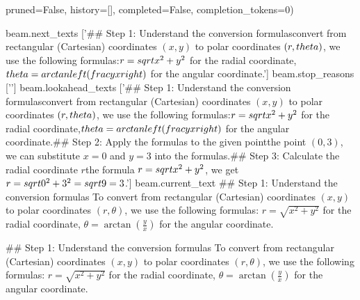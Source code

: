 pruned=False, history=[], completed=False, completion_tokens=0)

beam.next_texts
['## Step 1: Understand the conversion formulas\nTo convert from rectangular (Cartesian) coordinates $(x, y)$ to polar coordinates $(r, \\theta)$, we use the following formulas:\n$r = \\sqrt{x^2 + y^2}$ for the radial coordinate,\n$\\theta = \\arctan\\left(\\frac{y}{x}\\right)$ for the angular coordinate.\n\n']
beam.stop_reasons
['\n\n']
beam.lookahead_texts
['## Step 1: Understand the conversion formulas\nTo convert from rectangular (Cartesian) coordinates $(x, y)$ to polar coordinates $(r, \\theta)$, we use the following formulas:\n$r = \\sqrt{x^2 + y^2}$ for the radial coordinate,\n$\\theta = \\arctan\\left(\\frac{y}{x}\\right)$ for the angular coordinate.\n\n## Step 2: Apply the formulas to the given point\nGiven the point $(0, 3)$, we can substitute $x = 0$ and $y = 3$ into the formulas.\n\n## Step 3: Calculate the radial coordinate $r$\nUsing the formula $r = \\sqrt{x^2 + y^2}$, we get\n$r = \\sqrt{0^2 + 3^2} = \\sqrt{9} = 3$.\n\n']
beam.current_text
## Step 1: Understand the conversion formulas
To convert from rectangular (Cartesian) coordinates $(x, y)$ to polar coordinates $(r, \theta)$, we use the following formulas:
$r = \sqrt{x^2 + y^2}$ for the radial coordinate,
$\theta = \arctan\left(\frac{y}{x}\right)$ for the angular coordinate.


## Step 1: Understand the conversion formulas
To convert from rectangular (Cartesian) coordinates $(x, y)$ to polar coordinates $(r, \theta)$, we use the following formulas:
$r = \sqrt{x^2 + y^2}$ for the radial coordinate,
$\theta = \arctan\left(\frac{y}{x}\right)$ for the angular coordinate.



